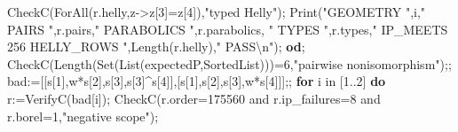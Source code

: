 \documentclass[
  10pt,
  letterpaper,
]{article}
\newenvironment{Shaded}{}{}
\newcommand{\BuiltInTok}[1]{\textcolor[rgb]{0.00,0.50,0.00}{#1}}
\newcommand{\ConstantTok}[1]{\textcolor[rgb]{0.53,0.00,0.00}{#1}}
\newcommand{\ControlFlowTok}[1]{\textcolor[rgb]{0.00,0.44,0.13}{\textbf{#1}}}
\newcommand{\ExtensionTok}[1]{#1}
\newcommand{\FloatTok}[1]{\textcolor[rgb]{0.25,0.63,0.44}{#1}}
\newcommand{\NormalTok}[1]{#1}
\newcommand{\OperatorTok}[1]{\textcolor[rgb]{0.40,0.40,0.40}{#1}}
\newcommand{\StringTok}[1]{\textcolor[rgb]{0.25,0.44,0.63}{#1}}
\newcommand{\VariableTok}[1]{\textcolor[rgb]{0.10,0.09,0.49}{#1}}
\begin{document}
\begin{Shaded}
\begin{Highlighting}[]
 \VariableTok{CheckC}\NormalTok{(}\BuiltInTok{ForAll}\NormalTok{(}\VariableTok{r}\NormalTok{.}\VariableTok{helly}\OperatorTok{,}\VariableTok{z}\OperatorTok{{-}\textgreater{}}\VariableTok{z}\NormalTok{[}\FloatTok{3}\NormalTok{]}\OperatorTok{=}\VariableTok{z}\NormalTok{[}\FloatTok{4}\NormalTok{])}\OperatorTok{,}\StringTok{"typed Helly"}\NormalTok{)}\OperatorTok{;}
 \BuiltInTok{Print}\NormalTok{(}\StringTok{"GEOMETRY "}\OperatorTok{,}\VariableTok{i}\OperatorTok{,}\StringTok{" PAIRS "}\OperatorTok{,}\VariableTok{r}\NormalTok{.}\VariableTok{pairs}\OperatorTok{,}\StringTok{" PARABOLICS "}\OperatorTok{,}\VariableTok{r}\NormalTok{.}\VariableTok{parabolics}\OperatorTok{,}
  \StringTok{" TYPES "}\OperatorTok{,}\VariableTok{r}\NormalTok{.}\VariableTok{types}\OperatorTok{,}\StringTok{" IP\_MEETS 256 HELLY\_ROWS "}\OperatorTok{,}\BuiltInTok{Length}\NormalTok{(}\VariableTok{r}\NormalTok{.}\VariableTok{helly}\NormalTok{)}\OperatorTok{,}\StringTok{" PASS\textbackslash{}n"}\NormalTok{)}\OperatorTok{;}
\ControlFlowTok{od}\OperatorTok{;}
\VariableTok{CheckC}\NormalTok{(}\BuiltInTok{Length}\NormalTok{(}\BuiltInTok{Set}\NormalTok{(}\BuiltInTok{List}\NormalTok{(}\VariableTok{expectedP}\OperatorTok{,}\BuiltInTok{SortedList}\NormalTok{)))}\OperatorTok{=}\FloatTok{6}\OperatorTok{,}\StringTok{"pairwise nonisomorphism"}\NormalTok{)}\OperatorTok{;;}
\VariableTok{bad}\OperatorTok{:=}\NormalTok{[[}\VariableTok{s}\NormalTok{[}\FloatTok{1}\NormalTok{]}\OperatorTok{,}\VariableTok{w}\OperatorTok{*}\VariableTok{s}\NormalTok{[}\FloatTok{2}\NormalTok{]}\OperatorTok{,}\VariableTok{s}\NormalTok{[}\FloatTok{3}\NormalTok{]}\OperatorTok{,}\VariableTok{s}\NormalTok{[}\FloatTok{3}\NormalTok{]}\OperatorTok{\^{}}\VariableTok{s}\NormalTok{[}\FloatTok{4}\NormalTok{]]}\OperatorTok{,}\NormalTok{[}\VariableTok{s}\NormalTok{[}\FloatTok{1}\NormalTok{]}\OperatorTok{,}\VariableTok{s}\NormalTok{[}\FloatTok{2}\NormalTok{]}\OperatorTok{,}\VariableTok{s}\NormalTok{[}\FloatTok{3}\NormalTok{]}\OperatorTok{,}\VariableTok{w}\OperatorTok{*}\VariableTok{s}\NormalTok{[}\FloatTok{4}\NormalTok{]]]}\OperatorTok{;;}
\ControlFlowTok{for} \VariableTok{i} \ExtensionTok{in}\NormalTok{ [}\FloatTok{1}\OperatorTok{..}\FloatTok{2}\NormalTok{] }\ControlFlowTok{do}
 \VariableTok{r}\OperatorTok{:=}\VariableTok{VerifyC}\NormalTok{(}\VariableTok{bad}\NormalTok{[}\VariableTok{i}\NormalTok{])}\OperatorTok{;}
 \VariableTok{CheckC}\NormalTok{(}\VariableTok{r}\NormalTok{.}\VariableTok{order}\OperatorTok{=}\FloatTok{175560} \ConstantTok{and} \VariableTok{r}\NormalTok{.}\VariableTok{ip\_failures}\OperatorTok{=}\FloatTok{8} \ConstantTok{and} \VariableTok{r}\NormalTok{.}\VariableTok{borel}\OperatorTok{=}\FloatTok{1}\OperatorTok{,}\StringTok{"negative scope"}\NormalTok{)}\OperatorTok{;}

\end{Highlighting}
\end{Shaded}
\end{document}
